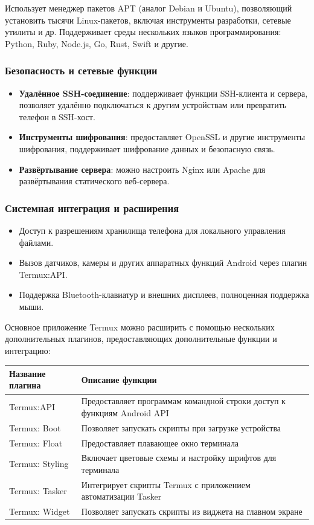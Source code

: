 Использует менеджер пакетов APT (аналог Debian и Ubuntu), позволяющий установить тысячи Linux-пакетов, включая инструменты разработки, сетевые утилиты и др. Поддерживает среды нескольких языков программирования: Python, Ruby, Node.js, Go, Rust, Swift и другие.

\subsubsection*{Безопасность и сетевые функции}

\begin{itemize}
  \item \textbf{Удалённое SSH-соединение}: поддерживает функции SSH-клиента и сервера, позволяет удалённо подключаться к другим устройствам или превратить телефон в SSH-хост.
  \item \textbf{Инструменты шифрования}: предоставляет OpenSSL и другие инструменты шифрования, поддерживает шифрование данных и безопасную связь.
  \item \textbf{Развёртывание сервера}: можно настроить Nginx или Apache для развёртывания статического веб-сервера.
\end{itemize}

\subsubsection*{Системная интеграция и расширения}

\begin{itemize}
  \item Доступ к разрешениям хранилища телефона для локального управления файлами.
  \item Вызов датчиков, камеры и других аппаратных функций Android через плагин Termux:API.
  \item Поддержка Bluetooth-клавиатур и внешних дисплеев, полноценная поддержка мыши.
\end{itemize}


Основное приложение Termux можно расширить с помощью нескольких дополнительных плагинов, предоставляющих дополнительные функции и интеграцию:

\begin{center}
\begin{tabularx}{\linewidth}{|X|X|}
\hline
\textbf{Название плагина} & \textbf{Описание функции} \tabularnewline
\hline
Termux:API & Предоставляет программам командной строки доступ к функциям Android API \tabularnewline
Termux: Boot & Позволяет запускать скрипты при загрузке устройства \tabularnewline
Termux: Float & Предоставляет плавающее окно терминала \tabularnewline
Termux: Styling & Включает цветовые схемы и настройку шрифтов для терминала \tabularnewline
Termux: Tasker & Интегрирует скрипты Termux с приложением автоматизации Tasker \tabularnewline
Termux: Widget & Позволяет запускать скрипты из виджета на главном экране \tabularnewline
\hline
\end{tabularx}
\end{center}

